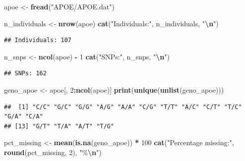 \documentclass[
]{article}
\newenvironment{Shaded}{\begin{snugshade}}{\end{snugshade}}
\newcommand{\DecValTok}[1]{\textcolor[rgb]{0.00,0.00,0.81}{#1}}
\newcommand{\FunctionTok}[1]{\textcolor[rgb]{0.13,0.29,0.53}{\textbf{#1}}}
\newcommand{\NormalTok}[1]{#1}
\newcommand{\OtherTok}[1]{\textcolor[rgb]{0.56,0.35,0.01}{#1}}
\newcommand{\SpecialCharTok}[1]{\textcolor[rgb]{0.81,0.36,0.00}{\textbf{#1}}}
\newcommand{\StringTok}[1]{\textcolor[rgb]{0.31,0.60,0.02}{#1}}
\begin{document}
\begin{Shaded}
\begin{Highlighting}[]
\NormalTok{apoe }\OtherTok{\textless{}{-}} \FunctionTok{fread}\NormalTok{(}\StringTok{"APOE/APOE.dat"}\NormalTok{)}

\NormalTok{n\_individuals }\OtherTok{\textless{}{-}} \FunctionTok{nrow}\NormalTok{(apoe)}
\FunctionTok{cat}\NormalTok{(}\StringTok{"Individuals:"}\NormalTok{, n\_individuals, }\StringTok{"}\SpecialCharTok{\textbackslash{}n}\StringTok{"}\NormalTok{)}
\end{Highlighting}
\end{Shaded}

\begin{verbatim}
## Individuals: 107
\end{verbatim}

\begin{Shaded}
\begin{Highlighting}[]
\NormalTok{n\_snps }\OtherTok{\textless{}{-}} \FunctionTok{ncol}\NormalTok{(apoe) }\SpecialCharTok{{-}} \DecValTok{1}
\FunctionTok{cat}\NormalTok{(}\StringTok{"SNPs:"}\NormalTok{, n\_snps, }\StringTok{"}\SpecialCharTok{\textbackslash{}n}\StringTok{"}\NormalTok{)}
\end{Highlighting}
\end{Shaded}

\begin{verbatim}
## SNPs: 162
\end{verbatim}

\begin{Shaded}
\begin{Highlighting}[]
\NormalTok{geno\_apoe }\OtherTok{\textless{}{-}}\NormalTok{ apoe[, }\DecValTok{2}\SpecialCharTok{:}\FunctionTok{ncol}\NormalTok{(apoe)]}
\FunctionTok{print}\NormalTok{(}\FunctionTok{unique}\NormalTok{(}\FunctionTok{unlist}\NormalTok{(geno\_apoe)))}
\end{Highlighting}
\end{Shaded}

\begin{verbatim}
##  [1] "C/C" "G/C" "G/G" "A/G" "A/A" "C/G" "T/T" "A/C" "C/T" "T/C" "G/A" "C/A"
## [13] "G/T" "T/A" "A/T" "T/G"
\end{verbatim}

\begin{Shaded}
\begin{Highlighting}[]
\NormalTok{pct\_missing }\OtherTok{\textless{}{-}} \FunctionTok{mean}\NormalTok{(}\FunctionTok{is.na}\NormalTok{(geno\_apoe)) }\SpecialCharTok{*} \DecValTok{100}
\FunctionTok{cat}\NormalTok{(}\StringTok{"Percentage missing:"}\NormalTok{, }\FunctionTok{round}\NormalTok{(pct\_missing, }\DecValTok{2}\NormalTok{), }\StringTok{"\%}\SpecialCharTok{\textbackslash{}n}\StringTok{"}\NormalTok{)}
\end{Highlighting}
\end{Shaded}
\end{document}
